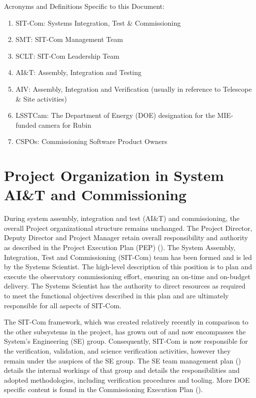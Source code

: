 \documentclass[SE,lsstdraft,authoryear,toc]{lsstdoc}
\begin{document}
Acronyms and Definitions Specific to this Document:
\begin{enumerate}
    \item SIT-Com: Systems Integration, Test \& Commissioning
    \item SMT: SIT-Com Management Team
    \item SCLT: SIT-Com Leadership Team
    \item AI\&T: Assembly, Integration and Testing
    \item AIV: Assembly, Integration and Verification (usually in reference to Telescope \& Site activities)
    \item LSSTCam: The Department of Energy (DOE) designation for the MIE-funded camera for Rubin
    \item CSPOs: Commissioning Software Product Owners
\end{enumerate}

\section{Project Organization in System AI\&T and Commissioning}
\label{sec:project_organization}

During system assembly, integration and test (AI\&T) and commissioning, the overall Project organizational structure remains unchanged.
The Project Director, Deputy Director and Project Manager retain overall responsibility and authority as described in the Project Execution Plan (PEP) ().
The System Assembly, Integration, Test and Commissioning (SIT-Com) team has been formed and is led by the Systems Scientist.
The high-level description of this position is to plan and execute the observatory commissioning effort, ensuring an on-time and on-budget delivery.
The Systems Scientist has the authority to direct resources as required to meet the functional objectives described in this plan and are ultimately responsible for all aspects of SIT-Com.

The SIT-Com framework, which was created relatively recently in comparison to the other subsystems in the project, has grown out of and now encompasses the System's Engineering (SE) group.
Consequently, SIT-Com is now responsible for the verification, validation, and science verification activities, however they remain under the auspices of the SE group.
The SE team management plan () details the internal workings of that group and details the responsibilities and adopted methodologies, including verification procedures and tooling.
More DOE specific content is found in the Commissioning Execution Plan ().
\end{document}
